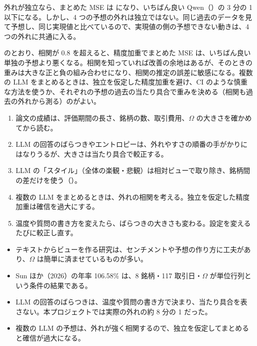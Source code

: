 \begin{table}[htbp]
\centering
\caption{対象論文の表 5 の MSE と、精度加重（$1/\mathrm{MSE}$ に比例）の重み。}
\label{tab:fusion-w}
\end{table}

外れが独立なら、まとめた MSE は  になり、いちばん良い Qwen（）の 3 分の 1 以下になる。しかし、4 つの予想の外れは独立ではない。同じ過去のデータを見て予想し、同じ実現値と比べているので、実現値の側の予想できない動きは、4 つの外れに共通に入る。

\begin{table}[htbp]
\centering
\caption{外れの相関 $\rho$（すべての組で同じとした）を変えたときの、まとめた MSE。「最適な組み合わせ」は、相関を知っていて、重みの和が 1 の範囲で MSE を最小にしたもの（負の重みも許す）。}
\label{tab:fusion-rho}
\end{table}

 のとおり、相関が 0.8 を超えると、精度加重でまとめた MSE は、いちばん良い単独の予想より悪くなる。相関を知っていれば改善の余地はあるが、そのときの重みは大きな正と負の組み合わせになり、相関の推定の誤差に敏感になる。複数の LLM をまとめるときは、独立を仮定した精度加重を避け、CI のような慎重な方法を使うか、それぞれの予想の過去の当たり具合で重みを決める（相関も過去の外れから測る）のがよい。

\begin{tipbox}
\begin{enumerate}
\item 論文の成績は、評価期間の長さ、銘柄の数、取引費用、$\Omega$ の大きさを確かめてから読む。
\item LLM の回答のばらつきやエントロピーは、外れやすさの順番の手がかりにはなりうるが、大きさは当たり具合で較正する。
\item LLM の「スタイル」（全体の楽観・悲観）は相対ビューで取り除き、銘柄間の差だけを使う（）。
\item 複数の LLM をまとめるときは、外れの相関を考える。独立を仮定した精度加重は確信を過大にする。
\item 温度や質問の書き方を変えたら、ばらつきの大きさも変わる。設定を変えるたびに較正し直す。
\end{enumerate}
\end{tipbox}

\begin{keybox}[この章のまとめ]
\begin{itemize}
\item テキストからビューを作る研究は、センチメントや予想の作り方に工夫があり、$\Omega$ は簡単に済ませているものが多い。
\item Sun ほか（2026）の年率 106.58\% は、8 銘柄・117 取引日・$\Omega$ が単位行列という条件の結果である。
\item LLM の回答のばらつきは、温度や質問の書き方で決まり、当たり具合を表さない。本プロジェクトでは実際の外れの約 8 分の 1 だった。
\item 複数の LLM の予想は、外れが強く相関するので、独立を仮定してまとめると確信が過大になる。
\end{itemize}
\end{keybox}
